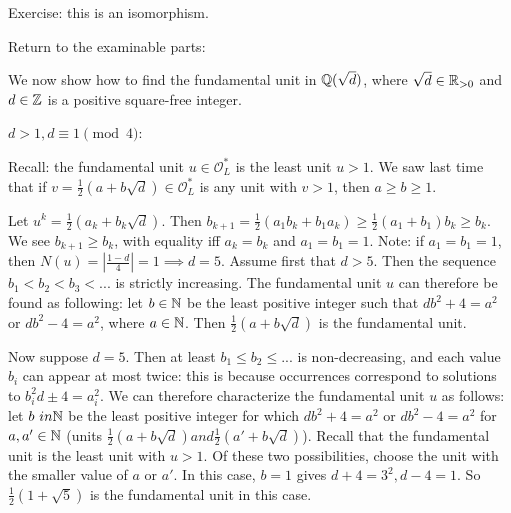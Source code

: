 \documentclass[a4paper]{article}
\begin{document}
Exercise: this is an isomorphism.

Return to the examinable parts:

We now show how to find the fundamental unit in $\mathbb{Q}(\sqrt{d})$, where $\sqrt{d} \in \mathbb{R}_{>0}$ and $d \in \mathbb{Z}$ is a positive square-free integer.

$d>1,d \equiv 1 \pmod 4$:

Recall: the fundamental unit $u \in \mathcal{O}_L^*$ is the least unit $u>1$. We saw last time that if $v=\frac{1}{2}(a+b\sqrt{d}) \in \mathcal{O}_L^*$ is any unit with $v>1$, then $a \geq b \geq 1$.

Let $u^k = \frac{1}{2} (a_k+b_k\sqrt{d})$. Then $b_{k+1} = \frac{1}{2} (a_1 b_k + b_1a_k) \geq \frac{1}{2} (a_1+b_1)b_k \geq b_k$. We see $b_{k+1} \geq b_k$, with equality iff $a_k = b_k$ and $a_1=b_1=1$. Note: if $a_1=b_1 =1$, then $N(u) = |\frac{1-d}{4}| = 1 \implies d=5$. Assume first that $d>5$. Then the sequence $b_1<b_2<b_3<...$ is strictly increasing. The fundamental unit $u$ can therefore be found as following: let $b \in \mathbb{N}$ be the least positive integer such that $db^2 + 4 = a^2$ or $db^2 - 4 = a^2$, where $a \in \mathbb{N}$. Then $\frac{1}{2} (a+b\sqrt{d})$ is the fundamental unit.

Now suppose $d=5$. Then at least $b_1 \leq b_2 \leq ...$ is non-decreasing, and each value $b_i$ can appear at most twice: this is because occurrences correspond to solutions to $b_i^2 d \pm 4 = a_i^2$. We can therefore characterize the fundamental unit $u$ as follows: let $b\ in \mathbb{N}$ be the least positive integer for which $db^2+4 = a^2$ or $db^2-4 = a^2$ for $a,a' \in \mathbb{N}$ (units $\frac{1}{2}(a+b\sqrt{d}) and \frac{1}{2} (a'+b\sqrt{d})$). Recall that the fundamental unit is the least unit with $u>1$. Of these two possibilities, choose the unit with the smaller value of $a$ or $a'$. In this case, $b=1$ gives $d+4=3^2,d-4=1$. So $\frac{1}{2} (1+\sqrt{5})$ is the fundamental unit in this case.

\iffalse
\begin{equation*}
\begin{aligned}

\end{aligned}
\end{equation*}
\fi
\end{document}
